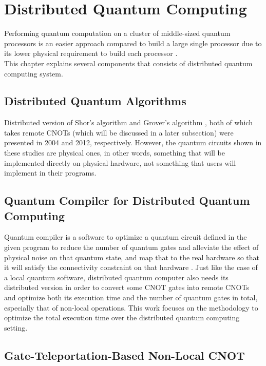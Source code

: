 \newpage

\section{Distributed Quantum Computing}
 
  Performing quantum computation on a cluster of middle-sized quantum processors is an easier approach compared to build a large single processor due to its lower physical requirement to build each processor \cite{distributedquantumcomputing}.  \\
This chapter explains several components that consists of distributed quantum computing system.

\subsection{Distributed Quantum Algorithms}

Distributed version of Shor's algorithm \cite{distributedshor} and Grover's algorithm \cite{distributedgrover}, both of which takes remote CNOTs (which will be discussed in a  later subsection) were presented in 2004 and 2012, respectively. 
However, the quantum circuits shown in these studies are physical ones, in other words, something that will be implemented directly on physical hardware, not something that users will implement in their programs. 

\subsection{Quantum Compiler for Distributed Quantum Computing}

 Quantum compiler is a software to optimize a quantum circuit defined in the given program to reduce the number of quantum gates and alleviate the effect of physical noise on that quantum state, and map that to the real hardware so that it will satisfy the connectivity constraint on that hardware \cite{qubitallocation}.  Just like the case of a local quantum software, distributed quantum computer also needs its distributed version in order to convert some CNOT gates into remote CNOTs and optimize both its execution time and the number of quantum gates in total, especially that of non-local operations.  This work focuses on the methodology to optimize the total execution time over the distributed quantum computing setting.
 
 \subsection{Gate-Teleportation-Based Non-Local CNOT}
 
